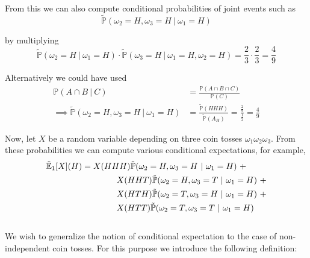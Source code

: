 \documentclass[12pt]{article}
\newlength\tindent
\renewcommand{\indent}{\hspace*{\tindent}}
\renewcommand{\P}{\mathbb P}
\newcommand{\E}{\mathbb E}
\begin{document}
From this we can also compute conditional probabilities of joint events such as
\begin{equation*}
	\tilde{\P}(\omega_2 = H, \omega_3 = H~|~\omega_1 = H)
\end{equation*}

by multiplying
\begin{equation*}
	\tilde{\P}(\omega_2 = H~|~\omega_1 = H)\cdot \tilde{\P}(\omega_3 = H~|~\omega_1 = H, \omega_2 = H) = \frac{2}{3}\cdot\frac{2}{3} = \frac{4}{9}
\end{equation*}

Alternatively we could have used
\begin{align*}
	\P(A\cap B ~|~ C) &= \frac{ \P(A\cap B\cap C) }{ \P(C) } \\
	\implies \tilde{\P}(\omega_2 = H, \omega_3 = H~|~\omega_1 = H) &= \frac{ \tilde{\P}(HHH) }{ \tilde{\P}(A_H) } = \frac{ \frac{2}{9} }{ \frac{1}{2} } = \frac{4}{9}
\end{align*}

Now, let $X$ be a random variable depending on three coin tosses $\omega_1\omega_2\omega_3$. From these probabilities we can compute various conditional expectations, for example,
\begin{align*}
	\tilde{\E}_1[X](H) &= X(HHH)\tilde{\P}(\omega_2 = H,\omega_3 = H~|~\omega_1 = H)~+ \\
	&\hphantom{{}={---}} X(HHT)\tilde{\P}(\omega_2 = H, \omega_3 = T~|~\omega_1 = H)~+ \\
	&\hphantom{{}={---}} X(HTH)\tilde{\P}(\omega_2 = T, \omega_3 = H~|~\omega_1 = H)~+ \\
	&\hphantom{{}={---}} X(HTT)\tilde{\P}(\omega_2 = T, \omega_3 = T~|~\omega_1 = H)
\end{align*} \\

\indent We wish to generalize the notion of conditional expectation to the case of non-independent coin tosses. For this purpose we introduce the following definition:
\end{document}
